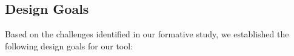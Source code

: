 




\subsection{Design Goals} \label{designgoal} Based on the challenges identified in our formative study, we established the following design goals for our tool:

